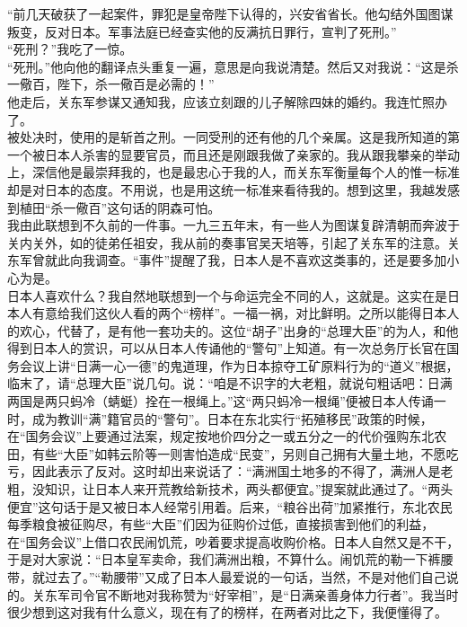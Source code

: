 “前几天破获了一起案件，罪犯是皇帝陛下认得的，兴安省省长。他勾结外国图谋叛变，反对日本。军事法庭已经查实他的反满抗日罪行，宣判了死刑。”\\

“死刑？”我吃了一惊。\\

“死刑。”他向他的翻译点头重复一遍，意思是向我说清楚。然后又对我说：“这是杀一儆百，陛下，杀一儆百是必需的！”\\

他走后，关东军参谋又通知我，应该立刻跟的儿子解除四妹的婚约。我连忙照办了。\\

被处决时，使用的是斩首之刑。一同受刑的还有他的几个亲属。这是我所知道的第一个被日本人杀害的显要官员，而且还是刚跟我做了亲家的。我从跟我攀亲的举动上，深信他是最崇拜我的，也是最忠心于我的人，而关东军衡量每个人的惟一标准却是对日本的态度。不用说，也是用这统一标准来看待我的。想到这里，我越发感到植田“杀一儆百”这句话的阴森可怕。\\

我由此联想到不久前的一件事。一九三五年末，有一些人为图谋复辟清朝而奔波于关内关外，如的徒弟任祖安，我从前的奏事官吴天培等，引起了关东军的注意。关东军曾就此向我调查。“事件”提醒了我，日本人是不喜欢这类事的，还是要多加小心为是。\\

日本人喜欢什么？我自然地联想到一个与命运完全不同的人，这就是。这实在是日本人有意给我们这伙人看的两个“榜样”。一福一祸，对比鲜明。之所以能得日本人的欢心，代替了，是有他一套功夫的。这位“胡子”出身的“总理大臣”的为人，和他得到日本人的赏识，可以从日本人传诵他的“警句”上知道。有一次总务厅长官在国务会议上讲“日满一心一德”的鬼道理，作为日本掠夺工矿原料行为的“道义”根据，临末了，请“总理大臣”说几句。说：“咱是不识字的大老粗，就说句粗话吧：日满两国是两只蚂冷（蜻蜓）拴在一根绳上。”这“两只蚂冷一根绳”便被日本人传诵一时，成为教训“满”籍官员的“警句”。日本在东北实行“拓殖移民”政策的时候，在“国务会议”上要通过法案，规定按地价四分之一或五分之一的代价强购东北农田，有些“大臣”如韩云阶等一则害怕造成“民变”，另则自己拥有大量土地，不愿吃亏，因此表示了反对。这时却出来说话了：“满洲国土地多的不得了，满洲人是老粗，没知识，让日本人来开荒教给新技术，两头都便宜。”提案就此通过了。“两头便宜”这句话于是又被日本人经常引用着。后来，“粮谷出荷”加紧推行，东北农民每季粮食被征购尽，有些“大臣”们因为征购价过低，直接损害到他们的利益，在“国务会议”上借口农民闹饥荒，吵着要求提高收购价格。日本人自然又是不干，于是对大家说：“日本皇军卖命，我们满洲出粮，不算什么。闹饥荒的勒一下裤腰带，就过去了。”“勒腰带”又成了日本人最爱说的一句话，当然，不是对他们自己说的。关东军司令官不断地对我称赞为“好宰相”，是“日满亲善身体力行者”。我当时很少想到这对我有什么意义，现在有了的榜样，在两者对比之下，我便懂得了。\\

